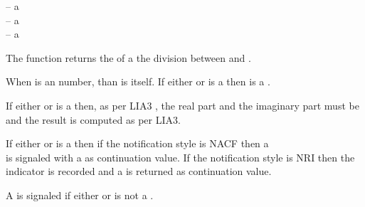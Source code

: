 \documentclass[../Comparisons-Predicates.tex]{subfiles}
\begin{document}

\DSyntax{}

   \RArrow {}

\DArgsNValues{}

 -- a \\
 -- a \\
 -- a 


\DDescription{}

The  function returns the 
 of a the division between  and .

When  is an  number, than 
is  itself.  If either  or  is a
 then  is a .

If either  or  is a 
then, as per LIA3 \cite{2004:LIA3}, the real part and the imaginary
part must be  and the result  is
computed as per LIA3.


\DExceptional{}

If either  or  is a 
then if the notification style is NACF then a\\
 is signaled with a
 as continuation value.  If the notification
style is NRI then the  indicator is recorded and a
 is returned as continuation value.

A  is signaled if either  or  is
not a .
\end{document}
